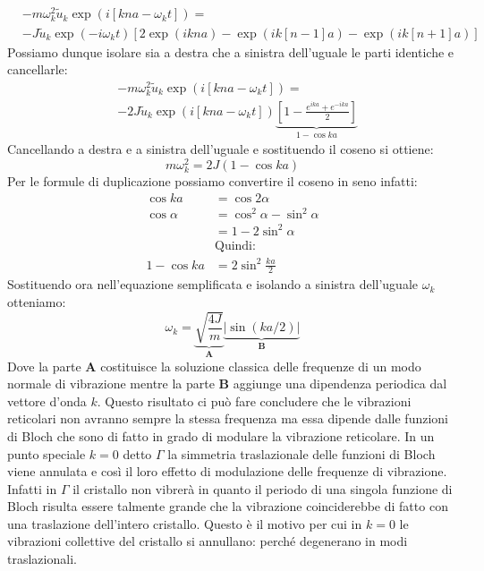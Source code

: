 \documentclass[oneside]{amsbook}
\numberwithin{section}{chapter}
\numberwithin{equation}{section}
\numberwithin{figure}{section}
\begin{document}
\begin{equation}
\begin{aligned}
&-m\omega_k^2\tilde{u}_k\exp(i[kna-\omega_kt])=\\&-J\tilde{u}_k\exp(-i\omega_kt)\left[2\exp(ikna)-\exp(ik[n-1]a)-\exp(ik[n+1]a)\right]
\end{aligned}
\end{equation}
Possiamo dunque isolare sia a destra che a sinistra dell'uguale le parti identiche e cancellarle:
\begin{equation}
\begin{aligned}
&-m\omega_k^2\tilde{u}_k\exp(i[kna-\omega_kt])=\\&-2J\tilde{u}_k\exp(i[kna-\omega_kt])\underbrace{\left[1-\frac{e^{ika}+e^{-ika}}{2}\right]}_{1-\cos ka}
\end{aligned}
\end{equation}
Cancellando  a destra e a sinistra dell'uguale e sostituendo il coseno si ottiene:
\begin{equation}
m\omega_k^2=2J(1-\cos ka)
\end{equation}
Per le formule di duplicazione possiamo convertire il coseno in seno infatti:
\begin{equation}
\begin{aligned}
\cos ka &= \cos2\alpha\\
\cos\alpha&=\cos^2\alpha-\sin^2\alpha\\
&=1-2\sin^2\alpha\\
&\text{Quindi:}\\
1-\cos ka&=2\sin^2\frac{ka}{2}
\end{aligned}
\end{equation}
Sostituendo ora nell'equazione semplificata e isolando a sinistra dell'uguale $\omega_k$ otteniamo:
\begin{equation}
\omega_k=\underbrace{\sqrt{\frac{4J}{m}}}_\textbf{A}\underbrace{\vert\sin(ka/2)\vert}_\textbf{B}
\end{equation}
Dove la parte \textbf{A} costituisce la soluzione classica delle frequenze di un modo normale di vibrazione mentre la parte \textbf{B} aggiunge una dipendenza periodica dal vettore d'onda $k$. Questo risultato ci può fare concludere che le vibrazioni reticolari non avranno sempre la stessa frequenza ma essa dipende dalle funzioni di Bloch che sono di fatto in grado di modulare la vibrazione reticolare. In un punto speciale $k=0$ detto $\Gamma$ la simmetria traslazionale delle funzioni di Bloch viene annulata e così il loro effetto di modulazione delle frequenze di vibrazione. Infatti in $\Gamma$ il cristallo non vibrerà in quanto il periodo di una singola funzione di Bloch risulta essere talmente grande che la vibrazione coinciderebbe di fatto con una traslazione dell'intero cristallo. Questo è il motivo per cui in $k=0$ le vibrazioni collettive del cristallo si annullano: perché degenerano in modi traslazionali.
\end{document}
